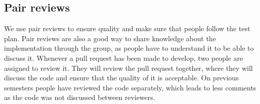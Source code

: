 \subsection{Pair reviews}
We use pair reviews to ensure quality and make sure that people follow the test plan.
Pair reviews are also a good way to share knowledge about the implementation through the group, as people have to understand it to be able to discuss it.
Whenever a pull request has been made to develop, two people are assigned to review it.
They will review the pull request together, where they will discuss the code and ensure that the quality of it is acceptable.
On previous semesters people have reviewed the code separately, which leads to less comments as the code was not discussed between reviewers.
